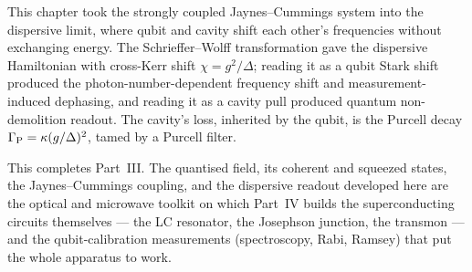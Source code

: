 This chapter took the strongly coupled Jaynes--Cummings system into
the dispersive limit, where qubit and cavity shift each other's
frequencies without exchanging energy. The Schrieffer--Wolff
transformation gave the dispersive Hamiltonian with cross-Kerr shift
$\chi=g^2/\Delta$; reading it as a qubit Stark shift produced the
photon-number-dependent frequency shift and measurement-induced
dephasing, and reading it as a cavity pull produced quantum
non-demolition readout. The cavity's loss, inherited by the qubit,
is the Purcell decay $\Gamma_{\rm P}=\kappa(g/\Delta)^2$, tamed by a
Purcell filter.

This completes Part~III. The quantised field, its coherent and
squeezed states, the Jaynes--Cummings coupling, and the dispersive
readout developed here are the optical and microwave toolkit on
which Part~IV builds the superconducting circuits themselves --- the
LC resonator, the Josephson junction, the transmon --- and the
qubit-calibration measurements (spectroscopy, Rabi, Ramsey) that put
the whole apparatus to work.

